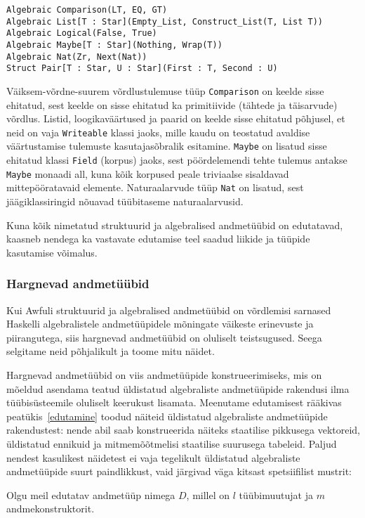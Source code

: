 \documentclass[12pt]{article}
\begin{document}
        \begin{verbatim}Algebraic Comparison(LT, EQ, GT)
Algebraic List[T : Star](Empty_List, Construct_List(T, List T))
Algebraic Logical(False, True)
Algebraic Maybe[T : Star](Nothing, Wrap(T))
Algebraic Nat(Zr, Next(Nat))
Struct Pair[T : Star, U : Star](First : T, Second : U)\end{verbatim}

        Väiksem-võrdne-suurem võrdlustulemuse tüüp \verb!Comparison! on keelde sisse ehitatud, sest keelde on sisse ehitatud ka primitiivide (tähtede ja täisarvude) võrdlus. Listid, loogikaväärtused ja paarid on keelde sisse ehitatud põhjusel, et neid on vaja \verb!Writeable! klassi jaoks, mille kaudu on teostatud avaldise väärtustamise tulemuste kasutajasõbralik esitamine. \verb!Maybe! on lisatud sisse ehitatud klassi \verb!Field! (korpus) jaoks, sest pöördelemendi tehte tulemus antakse \verb!Maybe! monaadi all, kuna kõik korpused peale triviaalse sisaldavad mittepööratavaid elemente. Naturaalarvude tüüp \verb!Nat! on lisatud, sest jäägiklassiringid nõuavad tüübitaseme naturaalarvusid.

        Kuna kõik nimetatud struktuurid ja algebralised andmetüübid on edutatavad, kaasneb nendega ka vastavate edutamise teel saadud liikide ja tüüpide kasutamise võimalus.
      \subsubsection{Hargnevad andmetüübid}\label{hargnevad}
        Kui Awfuli struktuurid ja algebralised andmetüübid on võrdlemisi sarnased Haskelli algebralistele andmetüüpidele mõningate väikeste erinevuste ja piirangutega, siis hargnevad andmetüübid on oluliselt teistsugused. Seega selgitame neid põhjalikult ja toome mitu näidet.

        Hargnevad andmetüübid on viis andmetüüpide konstrueerimiseks, mis on mõeldud asendama teatud üldistatud algebraliste andmetüüpide rakendusi ilma tüübisüsteemile oluliselt keerukust lisamata. Meenutame edutamisest rääkivas peatükis~\ref{edutamine} toodud näiteid üldistatud algebraliste andmetüüpide rakendustest: nende abil saab konstrueerida näiteks staatilise pikkusega vektoreid, üldistatud ennikuid ja mitmemõõtmelisi staatilise suurusega tabeleid. Paljud nendest kasulikest näidetest ei vaja tegelikult üldistatud algebraliste andmetüüpide suurt paindlikkust, vaid järgivad väga kitsast spetsiifilist mustrit:

        Olgu meil edutatav andmetüüp nimega $D$, millel on $l$ tüübimuutujat ja $m$ andmekonstruktorit.
\end{document}
